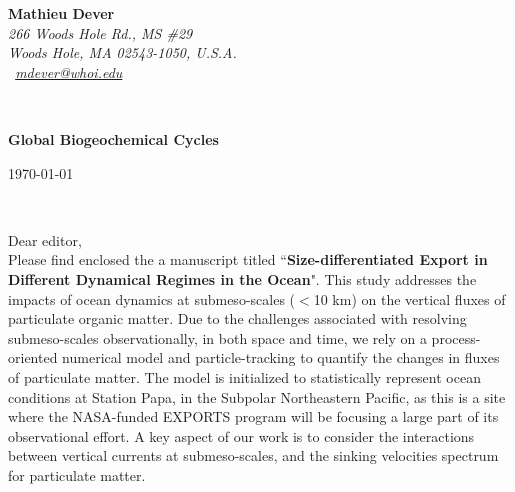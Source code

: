 \documentclass[11pt]{article}
\def\firstname{Mathieu }
\def\familyname{Dever}
\begin{document}
\sffamily   %


\hfill
\begin{minipage}[t]{.4\textwidth}
\raggedleft%
{\bfseries \firstname\familyname}\\[.35ex]
\small\itshape%
266 Woods Hole Rd., MS \#29\\
Woods Hole, MA 02543-1050, U.S.A.\\[.35ex]
\Letter~\href{mailto:mdever@whoi.edu}{mdever@whoi.edu}
\end{minipage}\\[0.5em]

\begin{minipage}[t]{.65\textwidth}
\raggedright%
{\bfseries Global Biogeochemical Cycles}\\[-.2cm]
\end{minipage}
\hfill
\begin{minipage}[t]{.3\textwidth}
\raggedleft
\today
\end{minipage}\\[-.3cm]
\raggedright

\justifying
\noindent Dear editor,\\
%


Please find enclosed the a manuscript titled ``\textbf{Size-differentiated Export in Different Dynamical Regimes in the Ocean}". This study addresses the impacts of ocean dynamics at submeso-scales ($<$10 km) on the vertical fluxes of particulate organic matter. Due to the challenges associated with resolving submeso-scales observationally, in both space and time, we rely on a process-oriented numerical model and particle-tracking to quantify the changes in fluxes of particulate matter. The model is initialized to statistically represent ocean conditions at Station Papa, in the Subpolar Northeastern Pacific, as this is a site where the NASA-funded EXPORTS program will be focusing a large part of its observational effort. A key aspect of our work is to consider the interactions between vertical currents at submeso-scales, and the sinking velocities spectrum for particulate matter. 
\end{document}
